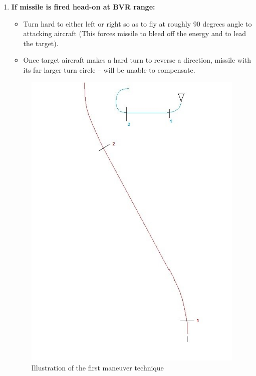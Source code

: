 \begin{enumerate}
	\item \textbf{If missile is fired head-on at BVR range:}
	\begin{itemize}
		\item Turn hard to either left or right so as to fly at roughly 90 degrees angle to attacking aircraft (This forces missile to bleed off the energy and to lead the target).
		\item Once target aircraft makes a hard turn to reverse a direction, missile with its far larger turn circle – will be unable to compensate.
	\end{itemize}
					\begin{figure}[H]
					 	\centering
					 	\includegraphics[scale = 0.25]{fig/evasiontech1.jpg}
					 	\caption{Illustration of the first maneuver technique}
					 \end{figure}

\end{enumerate}
